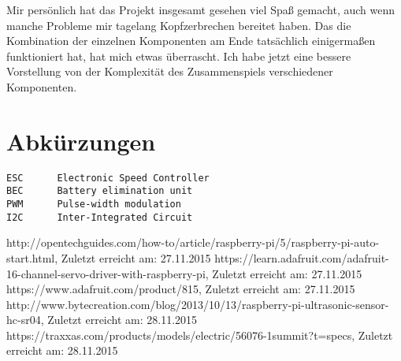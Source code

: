 \documentclass[a4paper,10pt]{scrartcl}
\begin{document}
    Mir persönlich hat das Projekt insgesamt gesehen viel Spaß gemacht, auch
    wenn manche Probleme mir tagelang Kopfzerbrechen bereitet haben.
    Das die Kombination der einzelnen Komponenten am Ende tatsächlich
    einigermaßen funktioniert hat, hat mich etwas überrascht.
    Ich habe jetzt eine bessere Vorstellung von der Komplexität des
    Zusammenspiels verschiedener Komponenten.

\section{Abkürzungen}
  \begin{lstlisting}
ESC      Electronic Speed Controller
BEC      Battery elimination unit
PWM      Pulse-width modulation
I2C      Inter-Integrated Circuit
  \end{lstlisting}

\begin{thebibliography}{9}
    http://opentechguides.com/how-to/article/raspberry-pi/5/raspberry-pi-auto-start.html,
    Zuletzt erreicht am: 27.11.2015
    https://learn.adafruit.com/adafruit-16-channel-servo-driver-with-raspberry-pi,
    Zuletzt erreicht am: 27.11.2015
    https://www.adafruit.com/product/815,
    Zuletzt erreicht am: 27.11.2015
    http://www.bytecreation.com/blog/2013/10/13/raspberry-pi-ultrasonic-sensor-hc-sr04,
    Zuletzt erreicht am: 28.11.2015
    https://traxxas.com/products/models/electric/56076-1summit?t=specs,
    Zuletzt erreicht am: 28.11.2015
\end{thebibliography}
\end{document}
